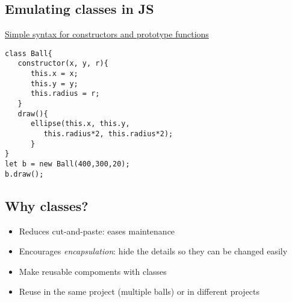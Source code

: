 \hypertarget{emulating-classes-in-js}{%
\subsection{Emulating classes in JS}\label{emulating-classes-in-js}}

\href{https://developer.mozilla.org/en-US/docs/Web/JavaScript/Reference/Classes}{Simple
syntax for constructors and prototype functions}

\begin{verbatim}
class Ball{
   constructor(x, y, r){
      this.x = x;
      this.y = y;
      this.radius = r;
   }
   draw(){
      ellipse(this.x, this.y,
         this.radius*2, this.radius*2);
      }
}
let b = new Ball(400,300,20);
b.draw();
\end{verbatim}

\hypertarget{why-classes}{%
\subsection{Why classes?}\label{why-classes}}

\begin{itemize}
\tightlist
\item
  Reduces cut-and-paste: eases maintenance
\item
  Encourages \emph{encapsulation}: hide the details so they can be
  changed easily
\item
  Make reusable compoments with classes
\item
  Reuse in the same project (multiple balls) or in different projects
\end{itemize}
